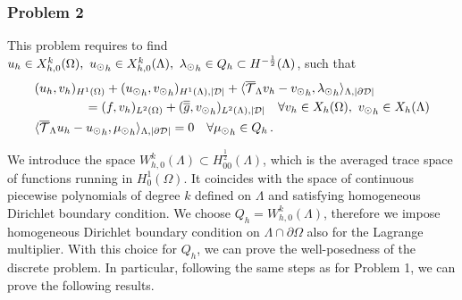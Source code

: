 \subsubsection{Problem 2}
This problem requires to find  $u_h \in X_{h,0}^k(\Omega) ,\ {u_{\odot}}_h \in X_{h,0}^k(\Lambda), \ {\lambda_{\odot}}_h \in Q_h \subset H^{-\frac12}(\Lambda)$, such that
\begin{subequations}
\begin{align}\label{eq:prob2_discrete}
&(u_h,v_h)_{H^1(\Omega)} + ({\ud}_h,{\vd}_h)_{H^1(\Lambda), |{\cal D}|} 
+  \langle  \mtrace v_h -  {\vd}_h, {\ld}_h \rangle_{\Lambda, |\DD|} 
\\
\nonumber
&\qquad\qquad= (f,v_h)_{L^2(\Omega)} + (\avrd{g},{\vd}_h)_{L^2(\Lambda), |{\cal D}|}
\quad \forall v_h \in X_h(\Omega), \ {\vd}_h \in X_h(\Lambda)
\\
&  \langle \mtrace u_h - {\ud}_h, {\md}_h \rangle_{\Lambda,| \DD| } = 0
\quad \forall {\md}_h \in Q_h\,.
\end{align}
\end{subequations}

We introduce the space
$W_{h,0}^k(\Lambda) \subset H^{\frac 12} _{00} (\Lambda)$, which is the averaged trace space of functions running in $H^1_0(\Omega)$. It coincides with the space of continuous piecewise polynomials of degree $k$ defined on $\Lambda$ and satisfying homogeneous Dirichlet boundary condition. 
We choose $Q_h=W_{h,0}^k(\Lambda)$, therefore we impose homogeneous Dirichlet boundary condition on $\Lambda \cap \partial \Omega$ also for the Lagrange multiplier. With this choice for $Q_h$, we can prove the well-posedness of the discrete problem. In particular, following the same steps as for Problem 1, we can prove the following results.

